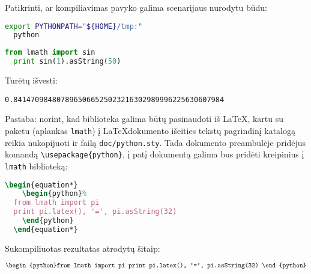 Patikrinti, ar kompiliavimas pavyko galima scenarijaus nurodytu būdu:
\begin{lstlisting}[language=bash]
  export PYTHONPATH="${HOME}/tmp:"
  python
\end{lstlisting}
\begin{lstlisting}[language=python]
  from lmath import sin
  print sin(1).asString(50)
\end{lstlisting}
Turėtų išvesti:
\begin{verbatim}
0.8414709848078965066525023216302989996225630607984
\end{verbatim}

Pastaba: norint, kad biblioteka galima būtų pasinaudoti iš \LaTeX, 
kartu su paketu (aplankas \verb|lmath|) į \LaTeX dokumento išeities
tekstų pagrindinį katalogą reikia nukopijuoti ir failą 
\verb|doc/python.sty|. Tada dokumento preambulėje pridėjus
komandą \verb|\usepackage{python}|, į patį dokumentą galima bus pridėti
kreipinius į \verb|lmath| biblioteką: 
\begin{lstlisting}[language=tex]
  \begin{equation*}
    \begin{python}%
  from lmath import pi
  print pi.latex(), '=', pi.asString(32)
    \end{python}
  \end{equation*}
\end{lstlisting}

Sukompiliuotas rezultatas atrodytų šitaip:

\begin{equation*}
  \begin{python}%
from lmath import pi
print pi.latex(), '=', pi.asString(32)
  \end{python}
\end{equation*}
